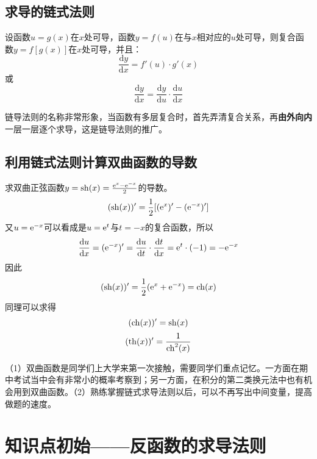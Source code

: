 \subsection{求导的链式法则}\label{sec:2.3.1}
设函数$u=g(x)$在$x$处可导，函数$y=f(u)$在与$x$相对应的$u$处可导，则复合函数$y=f[g(x)]$在$x$处可导，并且：
\begin{equation}
	\frac{\mathrm{d}y}{\mathrm{d}x}=f'(u)\cdot g'(x)\label{eq:2.3}
\end{equation}
或
\begin{equation}
	\frac{\mathrm{d}y}{\mathrm{d}x}=\frac{\mathrm{d}y}{\mathrm{d}u}\cdot\frac{\mathrm{d}u}{\mathrm{d}x}\label{eq:2.4}
\end{equation}

\begin{remark}
	链导法则的名称非常形象，当函数有多层复合时，首先弄清复合关系，再\textbf{由外向内}一层一层逐个求导，这是链导法则的推广。
\end{remark}

\subsection{利用链式法则计算双曲函数的导数}\label{sec:2.3.2}

\begin{example}
	求双曲正弦函数$y = {\rm sh}(x) = \frac{{\rm e}^x-{\rm e}^{-x}}{2}$的导数。
	\[({\rm sh}(x))'=\frac{1}{2}[({\rm e}^x)'-({\rm e}^{-x})']\]
	又$u={\rm e}^{-x}$可以看成是$u={\rm e}^t$与$t=-x$的复合函数，所以
	\[\frac{\mathrm{d}u}{\mathrm{d}x}=({\rm e}^{-x})'=\frac{\mathrm{d}u}{\mathrm{d}t}\cdot\frac{\mathrm{d}t}{\mathrm{d}x}={\rm e}^t\cdot{(-1)}=-{\rm e}^{-x}\]
	因此
	\[({\rm sh}(x))'=\frac{1}{2}({\rm e}^x+{\rm e}^{-x})={\rm ch}(x)\]
	同理可以求得
	\[({\rm ch}(x))'={\rm sh}(x)\]
	\[({\rm th}(x))'=\frac{1}{{\rm ch}^2(x)}\]
\end{example}

\begin{remark}
	（1）双曲函数是同学们上大学来第一次接触，需要同学们重点记忆。一方面在期中考试当中会有非常小的概率考察到；另一方面，在积分的第二类换元法中也有机会用到双曲函数。（2）熟练掌握链式求导法则以后，可以不再写出中间变量，提高做题的速度。
\end{remark}

\section{知识点初始——反函数的求导法则}\label{sec:2.4}

